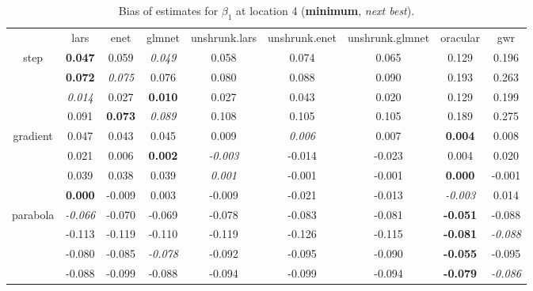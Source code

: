 \documentclass[authoryear, review, 11pt]{elsarticle}
\begin{document}
\begin{table}[ht]
\begin{center}
\begin{tabular}{ccccccccc}
  & lars & enet & glmnet & unshrunk.lars & unshrunk.enet & unshrunk.glmnet & oracular & gwr \\ 
  \cline{2-9}
  \multirow{4}{*}{step} & \textbf{0.047} & 0.059 & \emph{0.049} & 0.058 & 0.074 & 0.065 & 0.129 & 0.196 \\ 
  & \textbf{0.072} & \emph{0.075} & 0.076 & 0.080 & 0.088 & 0.090 & 0.193 & 0.263 \\ 
  & \emph{0.014} & 0.027 & \textbf{0.010} & 0.027 & 0.043 & 0.020 & 0.129 & 0.199 \\ 
  & 0.091 & \textbf{0.073} & \emph{0.089} & 0.108 & 0.105 & 0.105 & 0.189 & 0.275 \\ 
  \cline{2-9}
  \multirow{4}{*}{gradient} & 0.047 & 0.043 & 0.045 & 0.009 & \emph{0.006} & 0.007 & \textbf{0.004} & 0.008 \\ 
  & 0.021 & 0.006 & \textbf{0.002} & \emph{-0.003} & -0.014 & -0.023 & 0.004 & 0.020 \\ 
  & 0.039 & 0.038 & 0.039 & \emph{0.001} & -0.001 & -0.001 & \textbf{0.000} & -0.001 \\ 
  & \textbf{0.000} & -0.009 & 0.003 & -0.009 & -0.021 & -0.013 & \emph{-0.003} & 0.014 \\ 
  \cline{2-9}
  \multirow{4}{*}{parabola} & \emph{-0.066} & -0.070 & -0.069 & -0.078 & -0.083 & -0.081 & \textbf{-0.051} & -0.088 \\ 
  & -0.113 & -0.119 & -0.110 & -0.119 & -0.126 & -0.115 & \textbf{-0.081} & \emph{-0.088} \\ 
  & -0.080 & -0.085 & \emph{-0.078} & -0.092 & -0.095 & -0.090 & \textbf{-0.055} & -0.095 \\ 
  & -0.088 & -0.099 & -0.088 & -0.094 & -0.099 & -0.094 & \textbf{-0.079} & \emph{-0.086} \\ 
  \end{tabular}
\caption{Bias of estimates for $\beta_1$ at location 4 (\textbf{minimum}, \emph{next best}).\label{table:loc4-X1-BiasX}}
\end{center}
\end{table}
\end{document}
